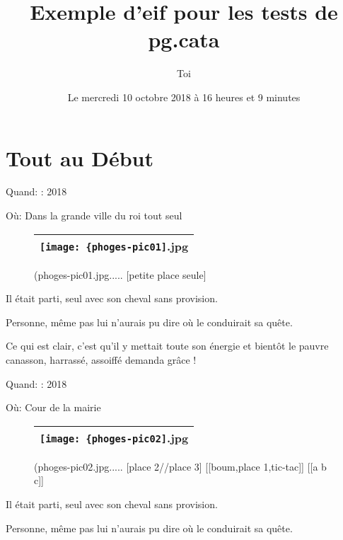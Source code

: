 \documentclass[12pt,twocolumn,french]{article}
\begin{document}
\title{Exemple d'eif pour les tests de pg.cata}
\author{Toi}
\date{Le mercredi 10 octobre 2018 à 16 heures et 9 minutes}
\maketitle
\tableofcontents
\newpage

%
\section{Tout au Début}
%


Quand: : 2018


Où: Dans la grande ville du roi tout seul

  \begin{figure}[H]
    \caption{
      (phoges-pic01.jpg.....
       [petite place seule] 
    }
    \vspace{4mm}
    \label{phoges-pic01.jpg}
    \noindent \centering{}
    \begin{tabular}{|c|}
      \hline
          \texttt{[image: \{phoges-pic01]}.jpg}
        \tabularnewline \hline
    \end{tabular}
  \end{figure}

Il était parti, seul avec son cheval sans provision.

Personne, même pas lui n'aurais pu dire où le conduirait sa quête.

Ce qui est clair, c'est qu'il y mettait toute son énergie et bientôt le pauvre canasson, harrassé, assoiffé demanda grâce !


Quand: : 2018


Où: Cour de la mairie

  \begin{figure}[H]
    \caption{
      (phoges-pic02.jpg.....
       [place 2//place 3] 
      [[boum,place 1,tic-tac]] 
      [[a b c]] 
    }
    \vspace{4mm}
    \label{phoges-pic02.jpg}
    \noindent \centering{}
    \begin{tabular}{|c|}
      \hline
          \texttt{[image: \{phoges-pic02]}.jpg}
        \tabularnewline \hline
    \end{tabular}
  \end{figure}

Il était parti, seul avec son cheval sans provision.

Personne, même pas lui n'aurais pu dire où le conduirait sa quête.
\end{document}
